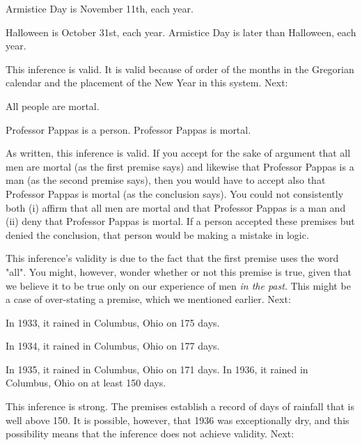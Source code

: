 \begin{earg*}
\item  Armistice Day is November 11th, each year. 
\item  Halloween is October 31st, each year.
\itemc  Armistice Day is later than Halloween, each year. 
\end{earg*}

This inference is valid. It is valid because of order of the months in the Gregorian calendar and the placement of the New Year in this system. Next:

\begin{earg*}
\item  All people are mortal. 
\item  Professor Pappas is a person. 
\itemc  Professor Pappas is mortal. 
\end{earg*}

As written, this inference is valid. If you accept for the sake of argument that all men are mortal (as the first premise says) and likewise that Professor Pappas is a man (as the second premise says), then you would have to accept also that Professor Pappas is mortal (as the conclusion says). You could not consistently both (i) affirm that all men are mortal and that Professor Pappas is a man and (ii) deny that Professor Pappas is mortal. If a person accepted these premises but denied the conclusion, that person would be making a mistake in logic.

This inference's validity is due to the fact that the first premise uses the word "all". You might, however, wonder whether or not this premise is true, given that we believe it to be true only on our experience of men \textit{in the past}. This might be a case of over-stating a premise, which we mentioned earlier. Next:

\begin{earg*}
\item  In 1933, it rained in Columbus, Ohio on 175 days.
\item  In 1934, it rained in Columbus, Ohio on 177 days.
\item  In 1935, it rained in Columbus, Ohio on 171 days.
\itemc  In 1936, it rained in Columbus, Ohio on at least 150 days.
\end{earg*}

This inference is strong. The premises establish a record of days of rainfall that is well above 150. It is possible, however, that 1936 was exceptionally dry, and this possibility means that the inference does not achieve validity. Next:

